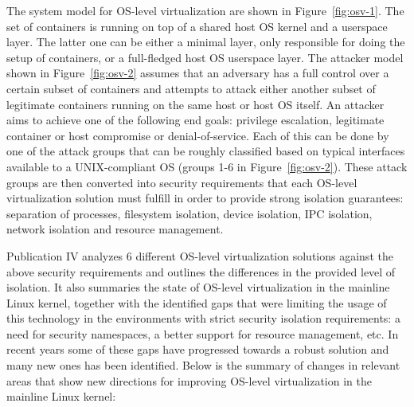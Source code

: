 The system model for OS-level virtualization are shown in Figure~\ref{fig:osv-1}. The set of containers  is running on top of a shared host OS kernel and a userspace layer. The latter one can be either a minimal layer, only responsible for doing the setup of containers, or a full-fledged host OS userspace layer. The attacker model shown in Figure~\ref{fig:osv-2} assumes that an adversary has a full control over a certain subset of containers and attempts to attack either another subset of legitimate containers running on the same host or host OS itself. An attacker aims to achieve one of the following end goals: privilege escalation, legitimate container or host compromise or denial-of-service. Each of this can be done by one of the attack groups that can be roughly classified based on typical interfaces available to a UNIX-compliant OS (groups 1-6 in Figure~\ref{fig:osv-2}). These attack groups are then converted into security requirements that each OS-level virtualization solution must fulfill in order to provide strong isolation guarantees: separation of processes, filesystem isolation, device isolation, IPC isolation, network isolation and resource management.   

Publication IV analyzes 6 different OS-level virtualization solutions against the above security requirements and outlines the differences in the provided level of isolation. It also summaries the state of OS-level virtualization in the mainline Linux kernel, together with the identified gaps that were limiting the usage of this technology in the environments with strict security isolation requirements: a need for security namespaces, a better support for resource management, etc. In recent years some of these gaps have progressed towards a robust solution and many new ones has been identified. Below is the summary of changes in relevant areas that show new directions for improving OS-level virtualization in the mainline Linux kernel:  

